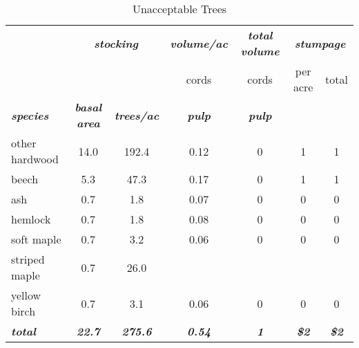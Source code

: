 \documentclass[landscape]{article}
\begin{document}
\begin{table}[H]

\caption{\label{tab:unnamed-chunk-36}Unacceptable Trees}
\fontsize{10}{12}\selectfont
\begin{tabular}[t]{lcccccc}
\toprule
\multicolumn{1}{c}{\em{\textbf{ }}} & \multicolumn{2}{c}{\em{\textbf{stocking}}} & \multicolumn{1}{c}{\em{\textbf{volume/ac }}} & \multicolumn{1}{c}{\em{\textbf{total volume}}} & \multicolumn{2}{c}{\em{\textbf{stumpage}}} \\
\cmidrule(l{3pt}r{3pt}){2-3} \cmidrule(l{3pt}r{3pt}){4-4} \cmidrule(l{3pt}r{3pt}){5-5} \cmidrule(l{3pt}r{3pt}){6-7}
\multicolumn{3}{c}{ } & \multicolumn{1}{c}{cords} & \multicolumn{1}{c}{cords} & \multicolumn{1}{c}{per acre} & \multicolumn{1}{c}{total} \\
\cmidrule(l{3pt}r{3pt}){4-4} \cmidrule(l{3pt}r{3pt}){5-5} \cmidrule(l{3pt}r{3pt}){6-6} \cmidrule(l{3pt}r{3pt}){7-7}
\rowcolor[HTML]{DCDCDC}  \em{\textbf{species}} & \em{\textbf{basal area}} & \em{\textbf{trees/ac}} & \em{\textbf{pulp}} & \em{\textbf{pulp}} & \em{\textbf{ }} & \em{\textbf{ }}\\
\midrule
\rowcolor{gray!6}  other hardwood & 14.0 & 192.4 & 0.12 & 0 & 1 & 1\\
 
beech & 5.3 & 47.3 & 0.17 & 0 & 1 & 1\\
 
\rowcolor{gray!6}  ash & 0.7 & 1.8 & 0.07 & 0 & 0 & 0\\
 
hemlock & 0.7 & 1.8 & 0.08 & 0 & 0 & 0\\
 
\rowcolor{gray!6}  soft maple & 0.7 & 3.2 & 0.06 & 0 & 0 & 0\\
 
striped maple & 0.7 & 26.0 &  &  &  & \\
 
\rowcolor{gray!6}  yellow birch & 0.7 & 3.1 & 0.06 & 0 & 0 & 0\\
 
\rowcolor[HTML]{DCDCDC}  \em{\textbf{total}} & \em{\textbf{22.7}} & \em{\textbf{275.6}} & \em{\textbf{0.54}} & \em{\textbf{1}} & \em{\textbf{\$2}} & \em{\textbf{\$2}}\\
\bottomrule
\end{tabular}
\end{table}
\end{document}
